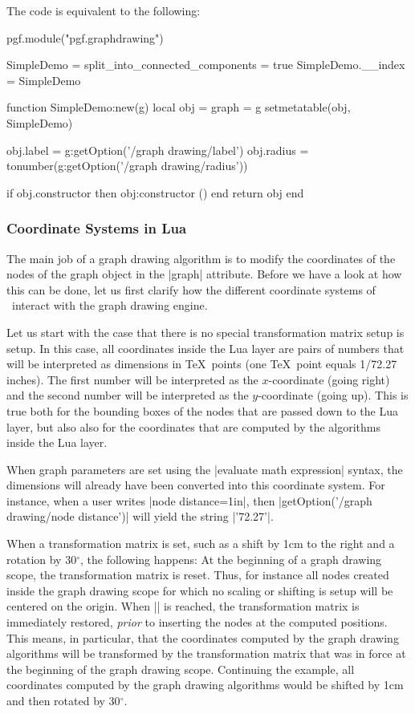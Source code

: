 The code is equivalent to the following:
\begin{codeexample}
pgf.module("pgf.graphdrawing")

SimpleDemo = { split_into_connected_components = true }
SimpleDemo.__index = SimpleDemo

function SimpleDemo:new(g)
  local obj = { graph = g }
  setmetatable(obj, SimpleDemo)
  
  obj.label  = g:getOption('/graph drawing/label')
  obj.radius = tonumber(g:getOption('/graph drawing/radius'))

  if obj.constructor then
    obj:constructor ()
  end
  return obj  
end  
\end{codeexample}



\subsubsection{Coordinate Systems in Lua}

\label{section-gd-lua-coordinates}

The main job of a graph drawing algorithm is to modify the
coordinates of the nodes of the graph object in the |graph|
attribute. Before we have a look at how this can be done, let us 
first clarify how the different coordinate systems of \pgfname\
interact with the graph drawing engine.

Let us start with the case that there is no special transformation
matrix setup is setup. In this case, all coordinates inside the Lua
layer are pairs of numbers that will be interpreted as dimensions in
\TeX\ points (one \TeX\ point equals 1/72.27 inches). The first number
will be interpreted as the $x$-coordinate (going right) and the second
number will be interpreted as the $y$-coordinate (going up). This is
true both for the bounding boxes of the nodes that are passed down to
the Lua layer, but also also for the coordinates that are computed by
the algorithms inside the Lua layer.

When graph parameters are set using the |evaluate math expression|
syntax, the dimensions will already have been converted into this
coordinate system. For instance, when a user writes
|node distance=1in|, then |getOption('/graph drawing/node distance')|
will yield the string |'72.27'|.

When a transformation matrix is
set, such as a shift by 1cm to the right and a rotation by
30$^\circ$, the following happens: At the beginning of a
graph drawing scope, the transformation matrix is reset. Thus, for
instance all nodes created inside the graph drawing scope for which no
scaling or shifting is setup will be centered on the origin. When
|\pgfgdendscope| is reached, the transformation matrix is immediately
restored, \emph{prior} to inserting the nodes at the computed
positions. This means, in particular, that the coordinates computed by
the graph drawing algorithms will be transformed by the transformation
matrix that was in force at the beginning of the graph drawing
scope. Continuing the example, all coordinates computed by the graph
drawing algorithms would be shifted by 1cm and then rotated by
30$^\circ$.

